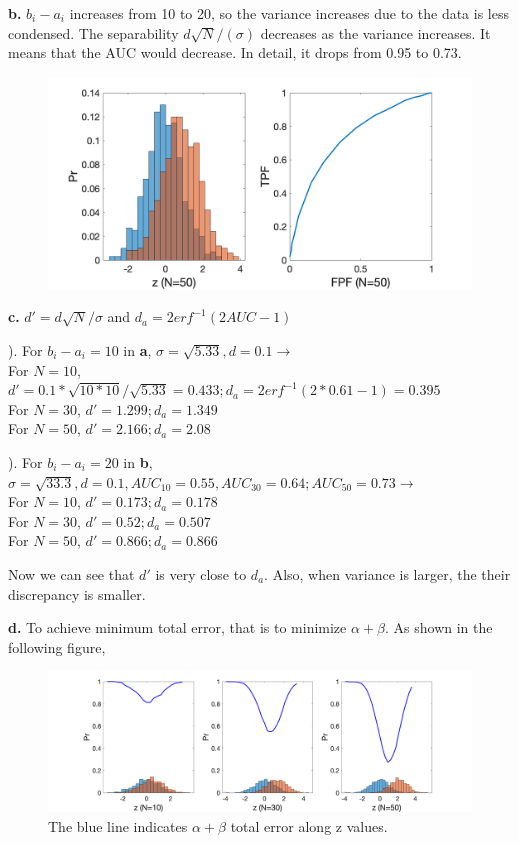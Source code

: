 \documentclass[12pt,a4paper]{article}
\begin{document}
\vspace{0.5cm}
\textbf{b.} 
$b_i-a_i$ increases from 10 to 20, so the variance increases due to the data is less condensed. The separability $d\sqrt{N}/(\sigma)$ decreases as the variance increases. It means that the AUC would decrease. In detail, it drops from 0.95 to 0.73.  
\begin{figure}[!ht]
    \centering
    \includegraphics*[width=\textwidth]{hw_8_3_b.png}
\end{figure}

\vspace{0.5cm}
\textbf{c.}
$d'=d\sqrt{N}/\sigma$ and $d_a=2erf^{-1}(2AUC-1)$

). For $b_i-a_i=10$ in \textbf{a}, $\sigma=\sqrt{5.33}, d=0.1\rightarrow$\\
For $N=10$, $d'=0.1*\sqrt{10*10}/\sqrt{5.33}=0.433; d_a=2erf^{-1}(2*0.61-1)=0.395$\\
For $N=30$, $d'=1.299;d_a=1.349$\\
For $N=50$, $d'=2.166;d_a=2.08$

\vspace{0.5cm}
). For $b_i-a_i=20$ in \textbf{b}, $\sigma=\sqrt{33.3},d=0.1,AUC_10=0.55,AUC_30=0.64;AUC_50=0.73\rightarrow$\\
For $N=10$, $d'=0.173;d_a=0.178$\\
For $N=30$, $d'=0.52;d_a=0.507$\\
For $N=50$, $d'=0.866;d_a=0.866$

Now we can see that $d'$ is very close to $d_a$. Also, when variance is larger, the their discrepancy is smaller.

\vspace{0.5cm}
\textbf{d.}
To achieve minimum total error, that is to minimize $\alpha+\beta$. As shown in the following figure, 
\begin{figure}[!ht]
\centering
\includegraphics*[width=\textwidth]{hw_8_3_d.png}
\caption{The blue line indicates $\alpha+\beta$ total error along z values.}
\end{figure}
\end{document}
